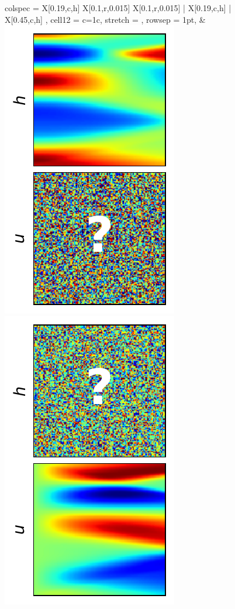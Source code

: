 \documentclass{article}
\begin{document}
\begin{figure}[t]
\begin{tblr}{
  colspec = {X[0.19,c,h] X[0.1,r,0.015] X[0.1,r,0.015] | X[0.19,c,h] | X[0.45,c,h] },
  cell{1}{2} = {c=1}{c}, %
  stretch = ,
  rowsep = 1pt,
}
  & \includegraphics[height=\myheight,trim={8mm 2mm 2mm 2mm},clip]{img/diff_cases/case1_inf.pdf}
     \hspace{1mm}
     \includegraphics[height=\myheight,trim={8mm 2mm 2mm 2mm},clip]{img/diff_cases/case2_inf.pdf}

\end{tblr}
\end{figure}
\end{document}
